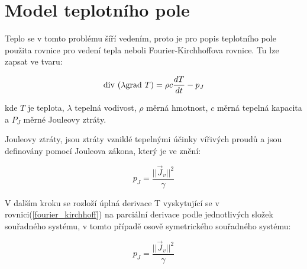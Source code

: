 \section{Model teplotního pole}
Teplo se v tomto problému šíří vedením, proto je pro popis teplotního pole použita rovnice pro vedení tepla neboli Fourier-Kirchhoffova rovnice. Tu lze zapsat ve tvaru:

\begin{equation}
	\mathrm{div}\  ( \lambda \mathrm{grad}\  T) = \rho c \frac{dT}{dt} - p_J 
	\label{fourier_kirchhoff} 
\end{equation} \cite{TZEP}

kde $T$ je teplota, $\lambda$ tepelná vodivost, $\rho$ měrná hmotnost, $c$ měrná tepelná kapacita a   $P_J$ měrné Jouleovy ztráty.

Jouleovy ztráty, jsou ztráty vzniklé tepelnými účinky vířivých proudů a jsou definovány pomocí Jouleova zákona, který je ve znění:

\begin{equation}
	p_{J}=\frac{||\vec{J}_{v}||^{2}}{\gamma}
	\label{joule_ztraty} 
\end{equation} 

V dalším kroku se rozloží úplná derivace T vyskytující se v rovnici(\ref{fourier_kirchhoff}) na parciální derivace podle jednotlivých složek souřadného systému, v tomto případě osově symetrického souřadného systému:

\begin{equation}
	p_{J}=\frac{||\vec{J}_{v}||^{2}}{\gamma}
	\label{joule_ztraty} 
\end{equation}